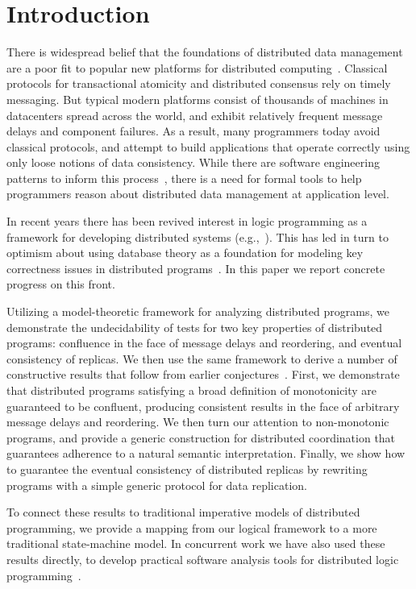 \section{Introduction}
There is widespread belief that the foundations of distributed data management are a poor fit to popular new platforms for distributed computing~\cite{ladis}. Classical protocols for transactional atomicity and distributed consensus rely on timely messaging. But typical modern platforms consist of thousands of machines in datacenters spread across the world, and exhibit relatively frequent message delays and component failures.  As a result, many programmers today avoid classical protocols, and attempt to build applications that operate correctly using only loose notions of data consistency.  While there are software engineering patterns to inform this process~\cite{quicksand}, there is a need for formal tools to help programmers reason about distributed data management at application level.

In recent years there has been revived interest in logic programming as a framework for developing distributed systems (e.g.,~\cite{reactors,boom}).  This has led in turn to optimism about using database theory as a foundation for modeling key correctness issues in distributed programs~\cite{podskey-sigrec}.
In this paper we report concrete progress on this front.  

Utilizing a model-theoretic framework for analyzing distributed programs, we demonstrate the undecidability of tests for two key properties of distributed programs: confluence in the face of message delays and reordering, and eventual consistency of replicas.  We then use the same framework to derive a number of constructive results that follow from earlier conjectures~\cite{podskey-sigrec}.
First, we demonstrate that distributed programs satisfying a broad definition of  monotonicity are guaranteed to be confluent, producing consistent results in the face of arbitrary message delays and reordering.  We then turn our attention to non-monotonic programs, and provide a generic construction for distributed coordination that guarantees adherence to a natural semantic interpretation.  Finally, we show how to guarantee the eventual consistency of distributed replicas by rewriting programs with a simple generic protocol for data replication.

To connect these results to traditional imperative models of distributed programming, we provide a mapping from our logical framework to a more traditional state-machine model.  In concurrent work we have also used these results directly, to develop practical software analysis tools for distributed logic programming~\cite{cidr11}.  

